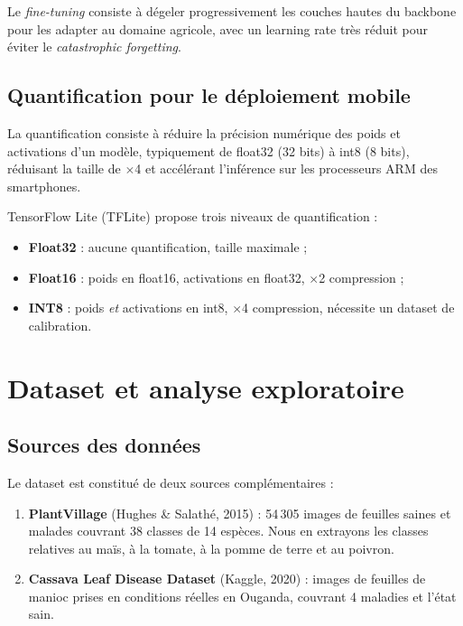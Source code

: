 \documentclass[12pt, a4paper, twoside]{report}
\begin{document}
Le \textit{fine-tuning} consiste à dégeler progressivement les couches hautes du backbone pour les adapter au domaine agricole, avec un learning rate très réduit pour éviter le \textit{catastrophic forgetting}.

\section{Quantification pour le déploiement mobile}

La quantification consiste à réduire la précision numérique des poids et activations d'un modèle, typiquement de float32 (32 bits) à int8 (8 bits), réduisant la taille de $\times$4 et accélérant l'inférence sur les processeurs ARM des smartphones.

TensorFlow Lite (TFLite) propose trois niveaux de quantification :
\begin{itemize}
    \item \textbf{Float32} : aucune quantification, taille maximale ;
    \item \textbf{Float16} : poids en float16, activations en float32, $\times$2 compression ;
    \item \textbf{INT8} : poids \textit{et} activations en int8, $\times$4 compression, nécessite un dataset de calibration.
\end{itemize}


\chapter{Dataset et analyse exploratoire}
\label{chap:dataset}

\section{Sources des données}

Le dataset est constitué de deux sources complémentaires :

\begin{enumerate}
    \item \textbf{PlantVillage} (Hughes \& Salathé, 2015) : 54\,305 images de feuilles saines et malades couvrant 38 classes de 14 espèces. Nous en extrayons les classes relatives au maïs, à la tomate, à la pomme de terre et au poivron.
    \item \textbf{Cassava Leaf Disease Dataset} (Kaggle, 2020) : images de feuilles de manioc prises en conditions réelles en Ouganda, couvrant 4 maladies et l'état sain.
\end{enumerate}
\end{document}
